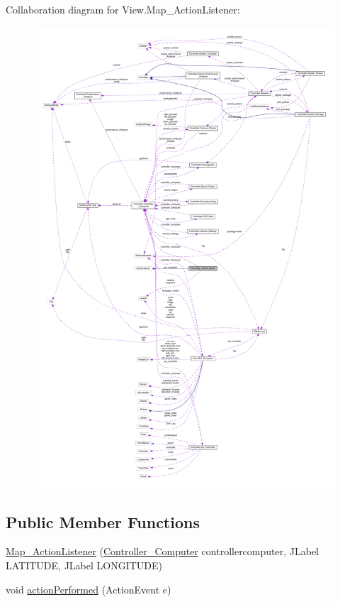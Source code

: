 Collaboration diagram for View.\+Map\+\_\+\+Action\+Listener\+:
\nopagebreak
\begin{figure}[H]
\begin{center}
\leavevmode
\includegraphics[width=350pt]{class_view_1_1_map___action_listener__coll__graph}
\end{center}
\end{figure}
\subsection*{Public Member Functions}
\begin{DoxyCompactItemize}
\item 
\hyperlink{class_view_1_1_map___action_listener_a652fcfdecd8cd7347ff24e39903196d9}{Map\+\_\+\+Action\+Listener} (\hyperlink{class_controller_1_1_controller___computer}{Controller\+\_\+\+Computer} controllercomputer, J\+Label L\+A\+T\+I\+T\+U\+D\+E, J\+Label L\+O\+N\+G\+I\+T\+U\+D\+E)
\item 
void \hyperlink{class_view_1_1_map___action_listener_af1f0b095cf304555fe84b6b64fc8acc6}{action\+Performed} (Action\+Event e)
\end{DoxyCompactItemize}


